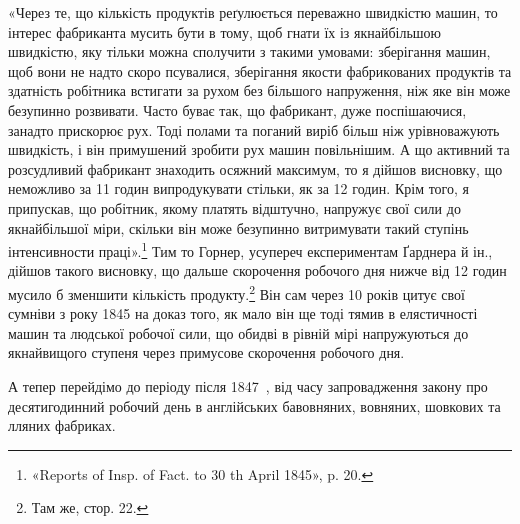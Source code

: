 «Через те, що кількість продуктів реґулюється переважно
швидкістю машин, то інтерес фабриканта мусить бути в тому,
щоб гнати їх із якнайбільшою швидкістю, яку тільки можна
сполучити з такими умовами: зберігання машин, щоб вони не
надто скоро псувалися, зберігання якости фабрикованих продуктів
та здатність робітника встигати за рухом без більшого напруження,
ніж яке він може безупинно розвивати. Часто буває так,
що фабрикант, дуже поспішаючися, занадто прискорює рух.
Тоді полами та поганий виріб більш ніж урівноважують швидкість,
і він примушений зробити рух машин повільнішим. А що
активний та розсудливий фабрикант знаходить осяжний максимум,
то я дійшов висновку, що неможливо за 11 годин випродукувати
стільки, як за 12 годин. Крім того, я припускав, що робітник,
якому платять відштучно, напружує свої сили до якнайбільшої
міри, скільки він може безупинно витримувати такий
ступінь інтенсивности праці».\footnote{
«Reports of Insp. of Fact. to 30 th April 1845», p. 20.
} Тим то Горнер, усупереч експериментам
Ґарднера й ін., дійшов такого висновку, що дальше скорочення
робочого дня нижче від 12 годин мусило б зменшити
кількість продукту.\footnote{
Там же, стор. 22.
} Він сам через 10 років цитує свої сумніви
з року 1845 на доказ того, як мало він ще тоді тямив в елястичності
машин та людської робочої сили, що обидві в рівній мірі
напружуються до якнайвищого ступеня через примусове скорочення
робочого дня.

А тепер перейдімо до періоду після 1847~, від часу запровадження
закону про десятигодинний робочий день в англійських
бавовняних, вовняних, шовкових та лляних фабриках.

